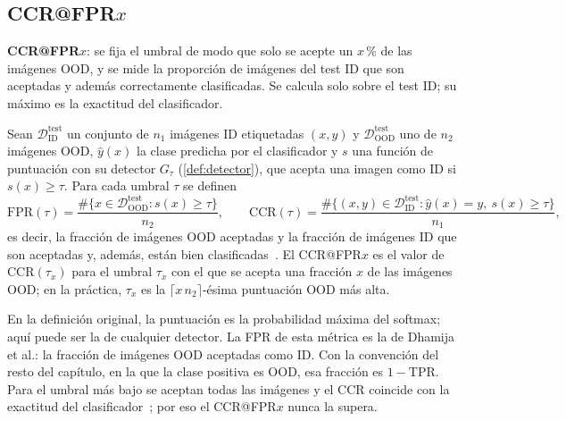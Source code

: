 \subsection{CCR@FPR$x$}\label{sec:ccr}

\textbf{CCR@FPR$x$}: se fija el umbral de modo que solo se acepte un $x$\,\% de las imágenes OOD, y se mide la proporción de imágenes del test ID que son aceptadas y además correctamente clasificadas. Se calcula solo sobre el test ID; su máximo es la exactitud del clasificador.
~\cite{dhamija2018} ~\cite{yang2024}
\begin{definicion}\label{def:ccr}
Sean $\mathcal{D}^{\mathrm{test}}_{\mathrm{ID}}$ un conjunto de $n_1$ imágenes ID etiquetadas $(x, y)$ y $\mathcal{D}^{\mathrm{test}}_{\mathrm{OOD}}$ uno de $n_2$ imágenes OOD, $\hat y(x)$ la clase predicha por el clasificador y $s$ una función de puntuación con su detector $G_\tau$ (\cref{def:detector}), que acepta una imagen como ID si $s(x) \geq \tau$. Para cada umbral $\tau$ se definen
\[
  \mathrm{FPR}(\tau) = \frac{\#\{x \in \mathcal{D}^{\mathrm{test}}_{\mathrm{OOD}} : s(x) \geq \tau\}}{n_2}, \qquad
  \mathrm{CCR}(\tau) = \frac{\#\{(x, y) \in \mathcal{D}^{\mathrm{test}}_{\mathrm{ID}} : \hat y(x) = y,\ s(x) \geq \tau\}}{n_1},
\]
es decir, la fracción de imágenes OOD aceptadas y la fracción de imágenes ID que son aceptadas y, además, están bien clasificadas~\cite[sec.~4, ec.~(3)]{dhamija2018}. El CCR@FPR$x$ es el valor de $\mathrm{CCR}(\tau_x)$ para el umbral $\tau_x$ con el que se acepta una fracción $x$ de las imágenes OOD; en la práctica, $\tau_x$ es la $\lceil x\, n_2 \rceil$-ésima puntuación OOD más alta.
\end{definicion}

En la definición original, la puntuación es la probabilidad máxima del softmax; aquí puede ser la de cualquier detector. La FPR de esta métrica es la de Dhamija et al.: la fracción de imágenes OOD aceptadas como ID. Con la convención del resto del capítulo, en la que la clase positiva es OOD, esa fracción es $1 - \mathrm{TPR}$. Para el umbral más bajo se aceptan todas las imágenes y el CCR coincide con la exactitud del clasificador~\cite[sec.~4]{dhamija2018}; por eso el CCR@FPR$x$ nunca la supera.

